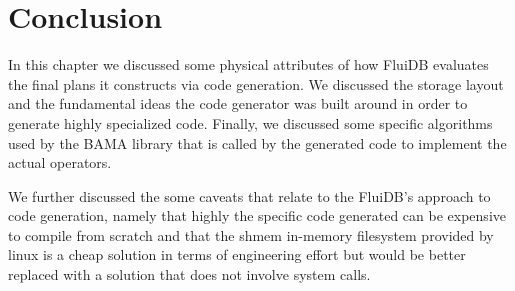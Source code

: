 \section{Conclusion}

In this chapter we discussed some physical attributes of how FluiDB
evaluates the final plans it constructs via code generation. We
discussed the storage layout and the fundamental ideas the code
generator was built around in order to generate highly specialized
code. Finally, we discussed some specific algorithms used by the BAMA
library that is called by the generated code to implement the actual
operators.

We further discussed the some caveats that relate to the FluiDB's
approach to code generation, namely that highly the specific code
generated can be expensive to compile from scratch and that the shmem
in-memory filesystem provided by linux is a cheap solution in terms of
engineering effort but would be better replaced with a solution that
does not involve system calls.
